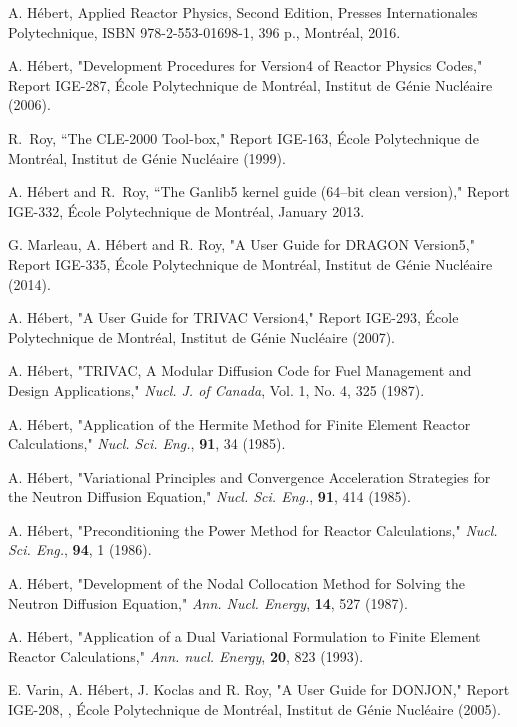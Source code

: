 \begin{thebibliography}{99}

A. H\'ebert, Applied Reactor Physics, Second Edition, Presses Internationales Polytechnique, ISBN 978-2-553-01698-1, 396 p., Montr\'eal, 2016.

A. H\'ebert, "Development Procedures for Version4 of
Reactor Physics Codes," Report IGE-287,
\'Ecole Polytechnique de Montr\'eal,
 Institut de G\'enie Nucl\'eaire (2006).

R.~Roy, ``The CLE-2000 Tool-box," 
Report IGE-163, \'Ecole Polytechnique de Montr\'eal,
Institut de G\'enie Nucl\'eaire (1999).

A. H\'ebert and R.~Roy,
``The Ganlib5 kernel guide (64--bit clean version),"
Report IGE-332, \'Ecole Polytechnique de Montr\'eal, January 2013.

G. Marleau, A. H\'ebert and R. Roy,
"A User Guide for DRAGON Version5,"
Report IGE-335, \'Ecole Polytechnique de Montr\'eal,
Institut de G\'enie Nucl\'eaire (2014).

A. H\'ebert, "A User Guide for TRIVAC Version4,"
Report IGE-293, \'Ecole Polytechnique de Montr\'eal,
Institut de G\'enie Nucl\'eaire (2007).

A. H\'ebert, "TRIVAC, A Modular Diffusion Code for Fuel Management and 
Design Applications," {\sl Nucl. J. of Canada}, Vol. 1, No. 4, 325 (1987).

A. H\'ebert, "Application of the Hermite Method for Finite Element 
Reactor Calculations," {\sl Nucl. Sci. Eng.}, {\bf 91}, 34 (1985).

A. H\'ebert, "Variational Principles and Convergence Acceleration 
Strategies for the Neutron Diffusion Equation," {\sl Nucl. Sci. Eng.}, 
{\bf 91}, 414 (1985).

A. H\'ebert, "Preconditioning the Power Method for Reactor Calculations,"
{\sl Nucl. Sci. Eng.}, {\bf 94}, 1 (1986).

A. H\'ebert, "Development of the Nodal Collocation Method for Solving 
the Neutron Diffusion Equation," {\sl Ann. Nucl. Energy}, {\bf 14}, 
527 (1987).

A. H\'ebert, "Application of a Dual Variational Formulation to Finite 
Element Reactor Calculations," {\sl Ann. nucl. Energy}, {\bf 20}, 823 (1993).

E. Varin,  A. H\'ebert, J. Koclas and R. Roy, "A User Guide for DONJON,"
Report IGE-208, , \'Ecole Polytechnique de Montr\'eal,
Institut de G\'enie Nucl\'eaire (2005).


\end{thebibliography}
